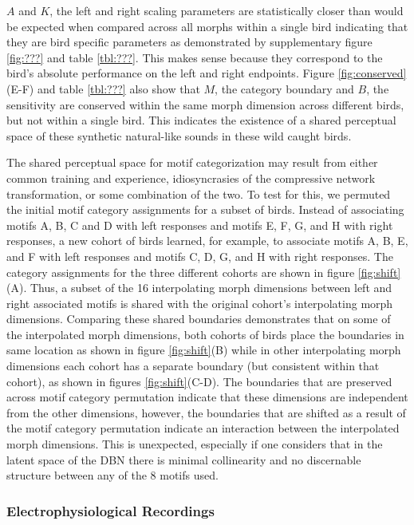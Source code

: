 $A$ and $K$, the left and right scaling parameters are statistically closer than would be expected when compared across all morphs within a single bird indicating that they are bird specific parameters as demonstrated by supplementary figure \ref{fig:???} and table \ref{tbl:???}. This makes sense because they correspond to the bird's absolute performance on the left and right endpoints. Figure \ref{fig:conserved}(E-F) and table \ref{tbl:???} also show that $M$, the category boundary and $B$, the sensitivity are conserved within the same morph dimension across different birds, but not within a single bird. This indicates the existence of a shared perceptual space of these synthetic natural-like sounds in these wild caught birds. 



The shared perceptual space for motif categorization may result from either common training and experience, idiosyncrasies of the compressive network transformation, or some combination of the two. To test for this, we permuted the initial motif category assignments for a subset of birds. Instead of associating motifs A, B, C and D with left responses and motifs E, F, G, and H with right responses, a new cohort of birds learned, for example, to associate motifs A, B, E, and F with left responses and motifs C, D, G, and H with right responses. The category assignments for the three different cohorts are shown in figure \ref{fig:shift}(A). Thus, a subset of the 16 interpolating morph dimensions between left and right associated motifs is shared with the original cohort's interpolating morph dimensions. Comparing these shared boundaries demonstrates that on some of the interpolated morph dimensions, both cohorts of birds place the boundaries in same location as shown in figure \ref{fig:shift}(B) while in other interpolating morph dimensions each cohort has a separate boundary (but consistent within that cohort), as shown in figures \ref{fig:shift}(C-D). The boundaries that are preserved across motif category permutation indicate that these dimensions are independent from the other dimensions, however, the boundaries that are shifted as a result of the motif category permutation indicate an interaction between the interpolated morph dimensions. This is unexpected, especially if one considers that in the latent space of the DBN there is minimal collinearity and no discernable structure between any of the 8 motifs used.


\subsubsection{Electrophysiological Recordings}

